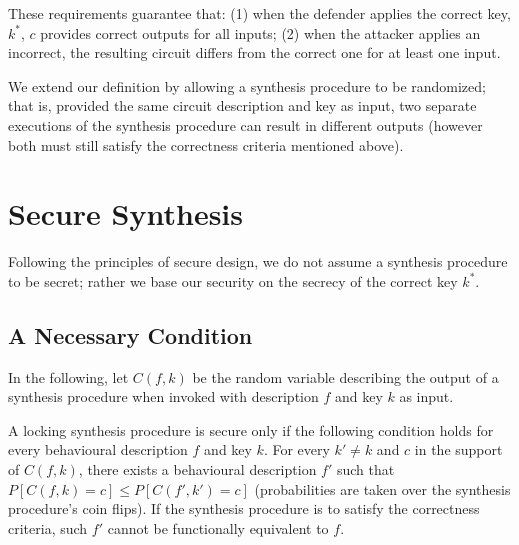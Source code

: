\documentclass[conference,compsoc]{IEEEtran}
\newenvironment{definition}[1][Definition]{\begin{trivlist}
\item[\hskip \labelsep {\bfseries #1}]}{\end{trivlist}}
\begin{document}
These requirements guarantee that: (1) when the defender applies the correct key, $k^{*}$,
$c$ provides correct outputs for all inputs; (2) when the attacker applies an incorrect, the resulting circuit differs from the correct one for at least one input.

We extend our definition by allowing a synthesis procedure to be randomized; that is, provided the same circuit description and key as input, two separate executions of the synthesis procedure can result in different outputs (however both must still satisfy the correctness criteria mentioned above).

\section{Secure Synthesis}
Following the principles of secure design, we do not assume a synthesis procedure to be secret; rather we base our security on the secrecy of the correct key $k^*$.

\subsection{A Necessary Condition}

In the following, let $C(f,k)$ be the random variable describing the output of a synthesis procedure when invoked with description $f$ and key $k$ as input.
\begin{definition}
A locking synthesis procedure is secure only if the following condition holds for every behavioural description $f$ and key $k$. For every $k'\neq k$ and $c$ in the support of $C(f,k)$, there exists a behavioural description $f'$ such that
$P[C(f,k)=c]\leq P[C(f',k')=c]$
(probabilities are taken over the synthesis procedure's coin flips). If the synthesis procedure is to satisfy the correctness criteria, such $f'$ cannot be functionally equivalent to $f$.

\end{definition}
\end{document}
